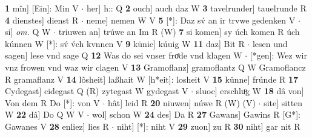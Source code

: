 \documentclass[8pt,a4paper,notitlepage]{article}
\begin{document}
\begin{table}[ht]
\begin{minipage}[t]{0.5\linewidth}
\textbf{1} mîn] [Ein]: Min V  $\cdot$ her] h:: Q \textbf{2} ouch] auch daz W \textbf{3} tavelrunder] tauelrunde R \textbf{4} dienstes] dienst R  $\cdot$ neme] nemen W V \textbf{5} [*]: Daz sv́ an ir trvwe gedenken V  $\cdot$ si] \textit{om.} Q W  $\cdot$ triuwen an] trúwe an Im R (W) \textbf{7} si komen] sy úch komen R úch kúnnen W [*]: sv́ v́ch kvnnen V \textbf{9} künic] kúuig W \textbf{11} daz] Bit R  $\cdot$ lesen und sagen] lese vnd sage Q \textbf{12} Was do sei vnser froͤde vnd klagen W  $\cdot$ [*gen]: Wez wir vnz frowen vnd waz wir clagen V \textbf{13} Gramoflanz] gramoflantz Q W Gramoflancz R gramaflanz V \textbf{14} lôsheit] laßhait W [h*eit]: losheit V \textbf{15} künne] frúnde R \textbf{17} Cydegast] cidegast Q (R) zytegast W gydegast V  $\cdot$ sluoc] erschluͦg W \textbf{18} dâ von] Von dem R Do [*]: von V  $\cdot$ hât] leid R \textbf{20} niuwen] núwe R (W) (V)  $\cdot$ site] sitten W \textbf{22} dâ] Do Q W V  $\cdot$ wol] schon W \textbf{24} des] Da R \textbf{27} Gawans] Gawins R [G*]: Gawanes V \textbf{28} enliez] lies R  $\cdot$ niht] [*]: niht V \textbf{29} zuon] zu R \textbf{30} niht] gar nit R \newline
\end{minipage}
\end{table}
\end{document}
